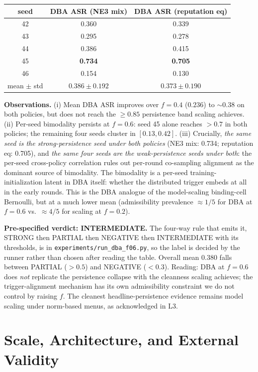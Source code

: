 \documentclass{article}
\begin{document}
\begin{center}\small
\begin{tabular}{c|cc}
\toprule
seed & DBA ASR (NE3 mix) & DBA ASR (reputation eq) \\
\midrule
42 & 0.360 & 0.339 \\
43 & 0.295 & 0.278 \\
44 & 0.386 & 0.415 \\
45 & \textbf{0.734} & \textbf{0.705} \\
46 & 0.154 & 0.130 \\
\midrule
mean $\pm$ std & $0.386 \pm 0.192$ & $0.373 \pm 0.190$ \\
\bottomrule
\end{tabular}
\end{center}

\textbf{Observations.} (i) Mean DBA ASR improves over $f{=}0.4$ ($0.236$) to $\sim 0.38$ on both policies, but does not reach the $\geq 0.85$ persistence band scaling achieves. (ii) Per-seed bimodality persists at $f{=}0.6$: seed 45 alone reaches $> 0.7$ in both policies; the remaining four seeds cluster in $[0.13, 0.42]$. (iii) Crucially, \emph{the same seed is the strong-persistence seed under both policies} (NE3 mix: 0.734; reputation eq: 0.705), and \emph{the same four seeds are the weak-persistence seeds under both}: the per-seed cross-policy correlation rules out per-round co-sampling alignment as the dominant source of bimodality. The bimodality is a per-seed training-initialization latent in DBA itself: whether the distributed trigger embeds at all in the early rounds. This is the DBA analogue of the model-scaling binding-cell Bernoulli, but at a much lower mean (admissibility prevalence $\approx 1/5$ for DBA at $f{=}0.6$ vs.\ $\approx 4/5$ for scaling at $f{=}0.2$).

\textbf{Pre-specified verdict: INTERMEDIATE.} The four-way rule that emits it, STRONG then PARTIAL then NEGATIVE then INTERMEDIATE with its thresholds, is in \texttt{experiments/\allowbreak run\_dba\_f06.py}, so the label is decided by the runner rather than chosen after reading the table. Overall mean $0.380$ falls between PARTIAL ($> 0.5$) and NEGATIVE ($< 0.3$). Reading: DBA at $f{=}0.6$ does \emph{not} replicate the persistence collapse with the cleanness scaling achieves; the trigger-alignment mechanism has its own admissibility constraint we do not control by raising $f$. The cleanest headline-persistence evidence remains model scaling under norm-based menus, as acknowledged in L3.

\section{Scale, Architecture, and External Validity}
\label{app:scale_external}
\end{document}
